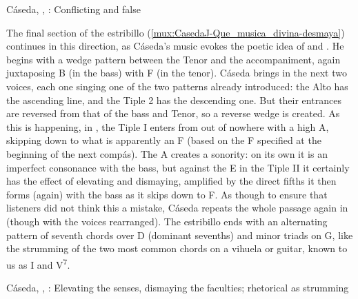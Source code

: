 {Cáseda, , : Conflicting
 and false }


The final section of the estribillo
(\cref{mux:CasedaJ-Que_musica_divina-desmaya}) continues in this direction,
as Cáseda's music evokes the poetic idea of  and
.
He begins with a wedge pattern between the Tenor and the accompaniment, again
juxtaposing B\fl{} (in the bass) with F\sh{} (in the tenor).
Cáseda brings in the next two voices, each one singing one of the two patterns
already introduced: the Alto has the ascending line, and the Tiple 2 has the
descending one.
But their entrances are reversed from that of the bass and Tenor, so a reverse
wedge is created.
As this is happening, in , the Tiple I enters from out of nowhere
with a high A, skipping down to what is apparently an F\na{} (based on the
F\sh{} specified at the beginning of the next compás).
The A creates a  sonority: on its own it is an imperfect
consonance with the bass, but against the E\fl{} in the Tiple II it certainly
has the effect of elevating and dismaying, amplified by the direct fifths it
then forms (again) with the bass as it skips down to F.
As though to ensure that listeners did not think this a mistake, Cáseda repeats
the whole passage again in  (though with the voices rearranged).
The estribillo ends with an alternating pattern of seventh chords over D
(dominant sevenths) and minor triads on G, like the strumming of the two most
common chords on a vihuela or guitar, known to us as I and
V\textsuperscript{7}.

{Cáseda, , : Elevating the senses,
dismaying the faculties; rhetorical  as strumming}

